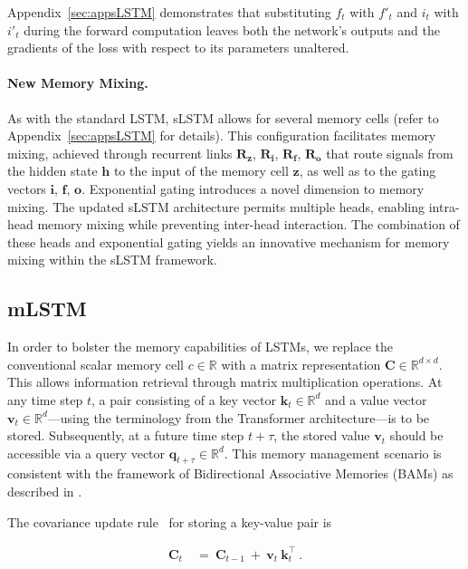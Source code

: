 Appendix~\ref{sec:appsLSTM} demonstrates that substituting $f_t$ with $f'_t$ and $i_t$ with $i'_t$ during the forward computation leaves both the network’s outputs and the gradients of the loss with respect to its parameters unaltered.

\paragraph{New Memory Mixing.} As with the standard LSTM, sLSTM allows for several memory cells (refer to Appendix~\ref{sec:appsLSTM} for details). This configuration facilitates memory mixing, achieved through recurrent links $\mathbf{R}_{\mathbf{z}}$, $\mathbf{R}_{\mathbf{i}}$, $\mathbf{R}_{\mathbf{f}}$, $\mathbf{R}_{\mathbf{o}}$ that route signals from the hidden state $\mathbf{h}$ to the input of the memory cell $\mathbf{z}$, as well as to the gating vectors $\mathbf{i}$, $\mathbf{f}$, $\mathbf{o}$. Exponential gating introduces a novel dimension to memory mixing. The updated sLSTM architecture permits multiple heads, enabling intra-head memory mixing while preventing inter-head interaction. The combination of these heads and exponential gating yields an innovative mechanism for memory mixing within the sLSTM framework.

\subsection{mLSTM}
\label{sec:mLSTM}

In order to bolster the memory capabilities of LSTMs, we replace the conventional scalar memory cell $c \in \mathbb{R}$ with a matrix representation $\mathbf{C} \in \mathbb{R}^{d \times d}$. This allows information retrieval through matrix multiplication operations. At any time step $t$, a pair consisting of a key vector $\mathbf{k}_t \in \mathbb{R}^d$ and a value vector $\mathbf{v}_t \in \mathbb{R}^d$—using the terminology from the Transformer architecture—is to be stored. Subsequently, at a future time step $t+\tau$, the stored value $\mathbf{v}_t$ should be accessible via a query vector $\mathbf{q}_{t+\tau} \in \mathbb{R}^d$. This memory management scenario is consistent with the framework of Bidirectional Associative Memories (BAMs) as described in \citep{Kohonen:72,Anderson:72,Nakano:72,Anderson:77}.

The covariance update rule~\citep{Sejnowski:77,Dayan:91} for storing a key-value pair is

\begin{align}
\mathbf{C}_t \ &= \ \mathbf{C}_{t-1} \ + \ \mathbf{v}_{t} \ \mathbf{k}_t^\top \ .
\end{align}

